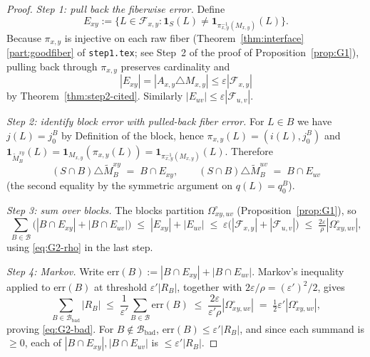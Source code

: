 \begin{proof}
\emph{Step 1: pull back the fiberwise error.}
Define
\[
E_{xy}:=\{L\in\mathcal F_{x,y}:\mathbf 1_S(L)\ne
\mathbf 1_{\pi_{x,y}^{-1}(M_{x,y})}(L)\}.
\]
Because $\pi_{x,y}$ is injective on each raw fiber
(Theorem~\ref{thm:interface}\ref{part:goodfiber} of \texttt{step1.tex};
see Step~2 of the proof of Proposition~\ref{prop:G1}), pulling back
through $\pi_{x,y}$ preserves cardinality and
\[
|E_{xy}|=|A_{x,y}\triangle M_{x,y}|\le\varepsilon|\mathcal F_{x,y}|
\]
by Theorem~\ref{thm:step2-cited}. Similarly $|E_{uv}|\le\varepsilon|\mathcal F_{u,v}|$.

\emph{Step 2: identify block error with pulled-back fiber error.}
For $L\in B$ we have $j(L)=j_0^B$ by Definition of the block, hence
$\pi_{x,y}(L)=(i(L),j_0^B)$ and
$\mathbf 1_{\tilde M_B^{xy}}(L)=\mathbf 1_{M_{x,y}}(\pi_{x,y}(L))
=\mathbf 1_{\pi_{x,y}^{-1}(M_{x,y})}(L)$. Therefore
\[
(S\cap B)\triangle\tilde M_B^{xy}\;=\;B\cap E_{xy},
\qquad
(S\cap B)\triangle\tilde M_B^{uv}\;=\;B\cap E_{uv}
\]
(the second equality by the symmetric argument on $q(L)=q_0^B$).

\emph{Step 3: sum over blocks.} The blocks partition $\Omega^\circ_{xy,uv}$
(Proposition~\ref{prop:G1}), so
\begin{equation}\label{eq:G2-sum}
\sum_{B\in\mathcal B}\!\bigl(|B\cap E_{xy}|+|B\cap E_{uv}|\bigr)
\;\le\;|E_{xy}|+|E_{uv}|
\;\le\;\varepsilon\bigl(|\mathcal F_{x,y}|+|\mathcal F_{u,v}|\bigr)
\;\le\;\tfrac{2\varepsilon}{\rho}|\Omega^\circ_{xy,uv}|,
\end{equation}
using \eqref{eq:G2-rho} in the last step.

\emph{Step 4: Markov.} Write $\mathrm{err}(B):=|B\cap E_{xy}|+|B\cap E_{uv}|$.
Markov's inequality applied to $\mathrm{err}(B)$ at threshold
$\varepsilon'|R_B|$, together with $2\varepsilon/\rho=(\varepsilon')^2/2$,
gives
\[
\sum_{B\in\mathcal B_{\mathrm{bad}}}|R_B|
\;\le\;\frac{1}{\varepsilon'}\sum_{B\in\mathcal B}\mathrm{err}(B)
\;\le\;\frac{2\varepsilon}{\varepsilon'\rho}|\Omega^\circ_{xy,uv}|
\;=\;\tfrac{1}{2}\varepsilon'|\Omega^\circ_{xy,uv}|,
\]
proving \eqref{eq:G2-bad}. For $B\notin\mathcal B_{\mathrm{bad}}$,
$\mathrm{err}(B)\le\varepsilon'|R_B|$, and since each summand is
$\ge0$, each of $|B\cap E_{xy}|,|B\cap E_{uv}|$ is
$\le\varepsilon'|R_B|$.
\end{proof}

